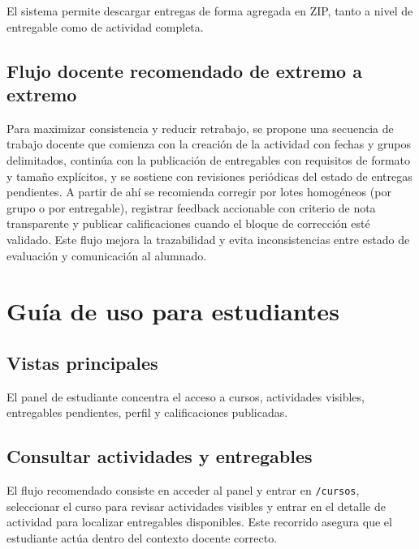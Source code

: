 El sistema permite descargar entregas de forma agregada en ZIP,
tanto a nivel de entregable como de actividad completa.

\subsection{Flujo docente recomendado de extremo a extremo}

Para maximizar consistencia y reducir retrabajo, se propone una secuencia de trabajo docente que comienza con la creaci\'on de la actividad con fechas y grupos delimitados, contin\'ua con la publicaci\'on de entregables con requisitos de formato y tama\~no expl\'icitos, y se sostiene con revisiones peri\'odicas del estado de entregas pendientes. A partir de ah\'i se recomienda corregir por lotes homog\'eneos (por grupo o por entregable), registrar feedback accionable con criterio de nota transparente y publicar calificaciones cuando el bloque de correcci\'on est\'e validado. Este flujo mejora la trazabilidad y evita inconsistencias entre estado de evaluaci\'on y comunicaci\'on al alumnado.

\FloatBarrier
\section{Gu\'ia de uso para estudiantes}

\subsection{Vistas principales}


El panel de estudiante concentra el acceso a cursos, actividades visibles,
entregables pendientes, perfil y calificaciones publicadas.

\subsection{Consultar actividades y entregables}


El flujo recomendado consiste en acceder al panel y entrar en \texttt{/cursos}, seleccionar el curso para revisar actividades visibles y entrar en el detalle de actividad para localizar entregables disponibles. Este recorrido asegura que el estudiante act\'ua dentro del contexto docente correcto.

